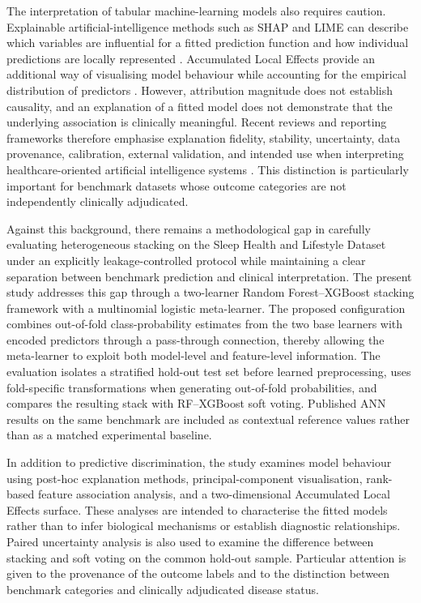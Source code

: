 \documentclass[a4paper,fleqn]{cas-dc}
\begin{document}
The interpretation of tabular machine-learning models also requires caution. Explainable artificial-intelligence methods such as SHAP and LIME can describe which variables are influential for a fitted prediction function and how individual predictions are locally represented \cite{lundberg2017,ribeiro2016,instanceshap2023}. Accumulated Local Effects provide an additional way of visualising model behaviour while accounting for the empirical distribution of predictors \cite{apley2020}. However, attribution magnitude does not establish causality, and an explanation of a fitted model does not demonstrate that the underlying association is clinically meaningful. Recent reviews and reporting frameworks therefore emphasise explanation fidelity, stability, uncertainty, data provenance, calibration, external validation, and intended use when interpreting healthcare-oriented artificial intelligence systems \cite{jung2023,allen2024,tripodai2024,futureai2025}. This distinction is particularly important for benchmark datasets whose outcome categories are not independently clinically adjudicated.

Against this background, there remains a methodological gap in carefully evaluating heterogeneous stacking on the Sleep Health and Lifestyle Dataset under an explicitly leakage-controlled protocol while maintaining a clear separation between benchmark prediction and clinical interpretation. The present study addresses this gap through a two-learner Random Forest--XGBoost stacking framework with a multinomial logistic meta-learner. The proposed configuration combines out-of-fold class-probability estimates from the two base learners with encoded predictors through a pass-through connection, thereby allowing the meta-learner to exploit both model-level and feature-level information. The evaluation isolates a stratified hold-out test set before learned preprocessing, uses fold-specific transformations when generating out-of-fold probabilities, and compares the resulting stack with RF--XGBoost soft voting. Published ANN results on the same benchmark are included as contextual reference values rather than as a matched experimental baseline.

In addition to predictive discrimination, the study examines model behaviour using post-hoc explanation methods, principal-component visualisation, rank-based feature association analysis, and a two-dimensional Accumulated Local Effects surface. These analyses are intended to characterise the fitted models rather than to infer biological mechanisms or establish diagnostic relationships. Paired uncertainty analysis is also used to examine the difference between stacking and soft voting on the common hold-out sample. Particular attention is given to the provenance of the outcome labels and to the distinction between benchmark categories and clinically adjudicated disease status.
\end{document}
